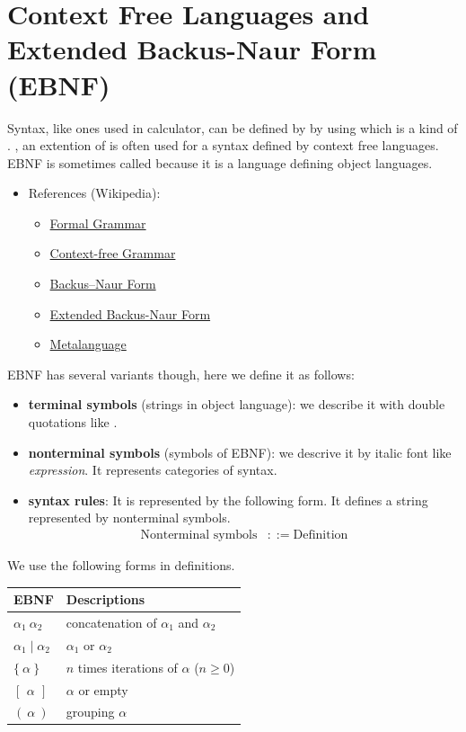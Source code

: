 \documentclass[11pt]{article}
\begin{document}
\section{Context Free Languages and Extended Backus-Naur Form (EBNF)}
\label{sec:orgheadline4}
Syntax, like ones used in calculator, can be defined by 
by using  which is a kind of . 
, an extention of
 is often used for a syntax defined by context free languages.
EBNF is sometimes called  because it is a
language defining object languages. 

\begin{itemize}
\item References (Wikipedia): 
\begin{itemize}
\item \href{https://en.wikipedia.org/wiki/Formal_grammar}{Formal Grammar}
\item \href{https://en.wikipedia.org/wiki/Context-free_grammar}{Context-free Grammar}
\item \href{https://en.wikipedia.org/wiki/Backus\%E2\%80\%93Naur_form}{Backus–Naur Form}
\item \href{https://en.wikipedia.org/wiki/Extended_Backus\%E2\%80\%93Naur_form}{Extended Backus-Naur Form}
\item \href{https://en.wikipedia.org/wiki/Metalanguage}{Metalanguage}
\end{itemize}
\end{itemize}


EBNF has several variants though, here we define it as follows:

\begin{itemize}
\item \textbf{terminal symbols} (strings in object language): 
we describe it with double quotations like .
\item \textbf{nonterminal symbols} (symbols of EBNF): 
we descrive it by italic font like \emph{expression}. It represents
categories of syntax.
\item \textbf{syntax rules}: 
It is represented by the following form. It defines a string
represented by nonterminal symbols. 
\begin{align*}
\mbox{Nonterminal symbols} & ::= \mbox{Definition}
\end{align*}
\end{itemize}

We use the following forms in definitions. 

\begin{center}
\begin{tabular}{ll}
\hline
EBNF & Descriptions\\
\hline
\(\alpha_1\ \alpha_2\) & concatenation of \(\alpha_1\) and \(\alpha_2\)\\
\(\alpha_1 \mid \alpha_2\) & \(\alpha_1\) or \(\alpha_2\)\\
\(\{\ \alpha\ \}\) & \(n\) times iterations of \(\alpha\) (\(n \ge 0\))\\
\([\ \,\alpha\ \,]\) & \(\alpha\) or empty\\
\((\ \alpha\ )\) & grouping \(\alpha\)\\
\hline
\end{tabular}
\end{center}
\end{document}

